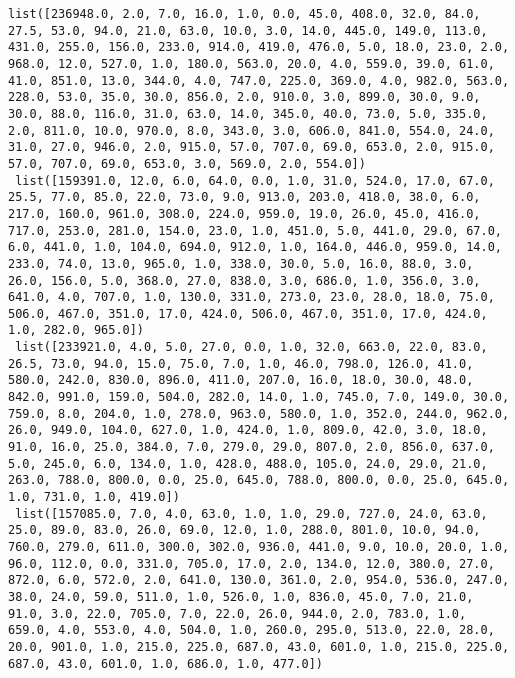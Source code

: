 \documentclass[11pt]{article}
\begin{document}
\begin{Verbatim}[commandchars=\\\{\}]
 list([236948.0, 2.0, 7.0, 16.0, 1.0, 0.0, 45.0, 408.0, 32.0, 84.0, 27.5, 53.0, 94.0, 21.0, 63.0, 10.0, 3.0, 14.0, 445.0, 149.0, 113.0, 431.0, 255.0, 156.0, 233.0, 914.0, 419.0, 476.0, 5.0, 18.0, 23.0, 2.0, 968.0, 12.0, 527.0, 1.0, 180.0, 563.0, 20.0, 4.0, 559.0, 39.0, 61.0, 41.0, 851.0, 13.0, 344.0, 4.0, 747.0, 225.0, 369.0, 4.0, 982.0, 563.0, 228.0, 53.0, 35.0, 30.0, 856.0, 2.0, 910.0, 3.0, 899.0, 30.0, 9.0, 30.0, 88.0, 116.0, 31.0, 63.0, 14.0, 345.0, 40.0, 73.0, 5.0, 335.0, 2.0, 811.0, 10.0, 970.0, 8.0, 343.0, 3.0, 606.0, 841.0, 554.0, 24.0, 31.0, 27.0, 946.0, 2.0, 915.0, 57.0, 707.0, 69.0, 653.0, 2.0, 915.0, 57.0, 707.0, 69.0, 653.0, 3.0, 569.0, 2.0, 554.0])
 list([159391.0, 12.0, 6.0, 64.0, 0.0, 1.0, 31.0, 524.0, 17.0, 67.0, 25.5, 77.0, 85.0, 22.0, 73.0, 9.0, 913.0, 203.0, 418.0, 38.0, 6.0, 217.0, 160.0, 961.0, 308.0, 224.0, 959.0, 19.0, 26.0, 45.0, 416.0, 717.0, 253.0, 281.0, 154.0, 23.0, 1.0, 451.0, 5.0, 441.0, 29.0, 67.0, 6.0, 441.0, 1.0, 104.0, 694.0, 912.0, 1.0, 164.0, 446.0, 959.0, 14.0, 233.0, 74.0, 13.0, 965.0, 1.0, 338.0, 30.0, 5.0, 16.0, 88.0, 3.0, 26.0, 156.0, 5.0, 368.0, 27.0, 838.0, 3.0, 686.0, 1.0, 356.0, 3.0, 641.0, 4.0, 707.0, 1.0, 130.0, 331.0, 273.0, 23.0, 28.0, 18.0, 75.0, 506.0, 467.0, 351.0, 17.0, 424.0, 506.0, 467.0, 351.0, 17.0, 424.0, 1.0, 282.0, 965.0])
 list([233921.0, 4.0, 5.0, 27.0, 0.0, 1.0, 32.0, 663.0, 22.0, 83.0, 26.5, 73.0, 94.0, 15.0, 75.0, 7.0, 1.0, 46.0, 798.0, 126.0, 41.0, 580.0, 242.0, 830.0, 896.0, 411.0, 207.0, 16.0, 18.0, 30.0, 48.0, 842.0, 991.0, 159.0, 504.0, 282.0, 14.0, 1.0, 745.0, 7.0, 149.0, 30.0, 759.0, 8.0, 204.0, 1.0, 278.0, 963.0, 580.0, 1.0, 352.0, 244.0, 962.0, 26.0, 949.0, 104.0, 627.0, 1.0, 424.0, 1.0, 809.0, 42.0, 3.0, 18.0, 91.0, 16.0, 25.0, 384.0, 7.0, 279.0, 29.0, 807.0, 2.0, 856.0, 637.0, 5.0, 245.0, 6.0, 134.0, 1.0, 428.0, 488.0, 105.0, 24.0, 29.0, 21.0, 263.0, 788.0, 800.0, 0.0, 25.0, 645.0, 788.0, 800.0, 0.0, 25.0, 645.0, 1.0, 731.0, 1.0, 419.0])
 list([157085.0, 7.0, 4.0, 63.0, 1.0, 1.0, 29.0, 727.0, 24.0, 63.0, 25.0, 89.0, 83.0, 26.0, 69.0, 12.0, 1.0, 288.0, 801.0, 10.0, 94.0, 760.0, 279.0, 611.0, 300.0, 302.0, 936.0, 441.0, 9.0, 10.0, 20.0, 1.0, 96.0, 112.0, 0.0, 331.0, 705.0, 17.0, 2.0, 134.0, 12.0, 380.0, 27.0, 872.0, 6.0, 572.0, 2.0, 641.0, 130.0, 361.0, 2.0, 954.0, 536.0, 247.0, 38.0, 24.0, 59.0, 511.0, 1.0, 526.0, 1.0, 836.0, 45.0, 7.0, 21.0, 91.0, 3.0, 22.0, 705.0, 7.0, 22.0, 26.0, 944.0, 2.0, 783.0, 1.0, 659.0, 4.0, 553.0, 4.0, 504.0, 1.0, 260.0, 295.0, 513.0, 22.0, 28.0, 20.0, 901.0, 1.0, 215.0, 225.0, 687.0, 43.0, 601.0, 1.0, 215.0, 225.0, 687.0, 43.0, 601.0, 1.0, 686.0, 1.0, 477.0])

\end{Verbatim}
\end{document}
